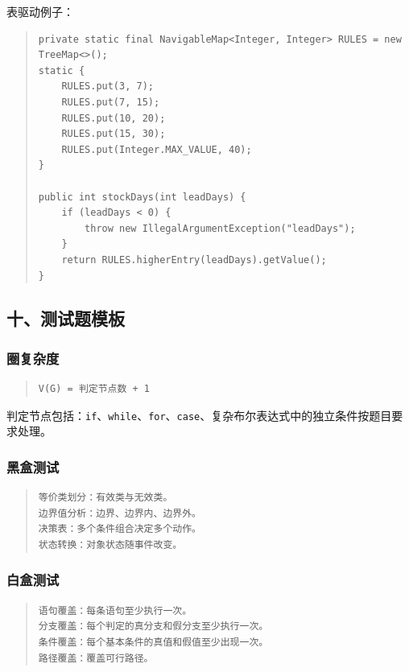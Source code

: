 \documentclass[UTF8,zihao=-4]{ctexart}
\begin{document}
表驱动例子：


\begin{quote}
\footnotesize
\begin{verbatim}
private static final NavigableMap<Integer, Integer> RULES = new TreeMap<>();
static {
    RULES.put(3, 7);
    RULES.put(7, 15);
    RULES.put(10, 20);
    RULES.put(15, 30);
    RULES.put(Integer.MAX_VALUE, 40);
}

public int stockDays(int leadDays) {
    if (leadDays < 0) {
        throw new IllegalArgumentException("leadDays");
    }
    return RULES.higherEntry(leadDays).getValue();
}
\end{verbatim}
\end{quote}


\subsection{十、测试题模板}


\subsubsection{圈复杂度}


\begin{quote}
\footnotesize
\begin{verbatim}
V(G) = 判定节点数 + 1
\end{verbatim}
\end{quote}


判定节点包括：\texttt{if}、\texttt{while}、\texttt{for}、\texttt{case}、复杂布尔表达式中的独立条件按题目要求处理。


\subsubsection{黑盒测试}


\begin{quote}
\footnotesize
\begin{verbatim}
等价类划分：有效类与无效类。
边界值分析：边界、边界内、边界外。
决策表：多个条件组合决定多个动作。
状态转换：对象状态随事件改变。
\end{verbatim}
\end{quote}


\subsubsection{白盒测试}


\begin{quote}
\footnotesize
\begin{verbatim}
语句覆盖：每条语句至少执行一次。
分支覆盖：每个判定的真分支和假分支至少执行一次。
条件覆盖：每个基本条件的真值和假值至少出现一次。
路径覆盖：覆盖可行路径。
\end{verbatim}
\end{quote}
\end{document}
